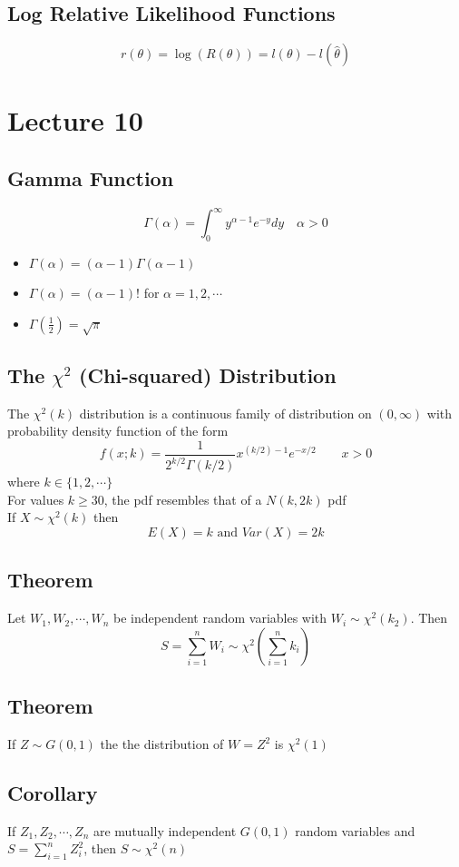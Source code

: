 \documentclass[11pt]{article}
\newcommand{\ds}{\displaystyle}
\begin{document}
\subsection{Log Relative Likelihood Functions}
\[r(\theta)=\log(R(\theta))=l(\theta)-l(\hat{\theta})\]

\section{Lecture 10}
\subsection{Gamma Function}
\[\Gamma(\alpha) = \int_{0}^{\infty}y^{\alpha-1}e^{-y}dy\quad\alpha>0\]
\begin{itemize}
  \item $\Gamma(\alpha)=(\alpha-1)\Gamma(\alpha-1)$
  \item $\Gamma(\alpha)=(\alpha-1)!$ for $\alpha=1,2,\cdots$
  \item $\Gamma(\frac{1}{2})=\sqrt{\pi}$
\end{itemize}
\subsection{The $\chi^2$ (Chi-squared) Distribution}
The $\chi^2(k)$ distribution is a continuous family of distribution on $(0,\infty)$ with probability density function of the form 
\[f(x;k) = \dfrac{1}{2^{k/2}\Gamma(k/2)}x^{(k/2)-1}e^{-x/2}\quad\quad x>0\]
where $k\in\{1,2,\cdots\}$ \\
For values $k\geq30$, the pdf resembles that of a $N(k,2k)$ pdf \\
If $X\sim\chi^2(k)$ then 
\[E(X)=k\text{ and } Var(X)=2k\]
\subsection{Theorem}
Let $W_1,W_2,\cdots,W_n$ be independent random variables with $W_i\sim\chi^2(k_2)$.
Then \[S=\sum_{i=1}^{n}W_i\sim\chi^2(\sum_{i=1}^{n}k_i)\]
\subsection{Theorem}
If $Z\sim G(0,1)$ the the distribution of $W=Z^2$ is $\chi^2(1)$
\subsection{Corollary}
If $Z_1,Z_2,\cdots,Z_n$ are mutually independent $G(0,1)$ random variables and $S = \ds\sum_{i=1}^{n}Z_i^2$, then $S\sim\chi^2(n)$
\end{document}
